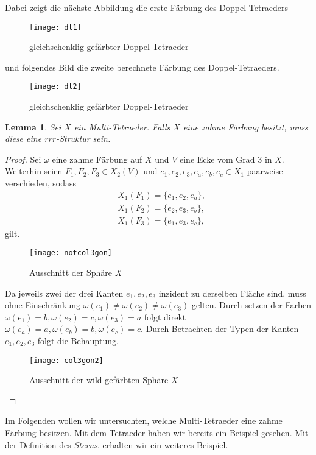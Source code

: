 \documentclass[12pt,titlepage,twoside,cleardoublepage]{article}
\newtheorem{lemma}[zahl]{Lemma}
\numberwithin{equation}{section}
\begin{document}
Dabei zeigt die nächste Abbildung die erste Färbung des Doppel-Tetraeders 
\begin{figure}[H]
\begin{center}
\texttt{[image: dt1]}
\end{center}
\caption{gleichschenklig gefärbter Doppel-Tetraeder}
\end{figure}
und folgendes Bild die zweite berechnete Färbung des Doppel-Tetraeders.
\begin{figure}[H]
\begin{center}
\texttt{[image: dt2]}
\end{center}
\caption{gleichschenklig gefärbter Doppel-Tetraeder}
\end{figure}
\begin{lemma}
Sei $X$ ein Multi-Tetraeder. Falls $X$ eine zahme Färbung besitzt, muss diese eine $rrr$-Struktur sein.
\end{lemma}
\begin{proof}
Sei $\omega$ eine zahme Färbung auf $X$ und $V$ eine Ecke vom Grad 3 in $X.$ Weiterhin seien $F_1,F_2,F_3\in X_2(V)$ und $e_1,e_2,e_3,e_a,e_b,e_c\in X_1$ paarweise verschieden, sodass 
\begin{align*}
&X_1(F_1)=\{e_1,e_2,e_a\},\\
&X_1(F_2)=\{e_2,e_3,e_b\}, \\
&X_1(F_3)=\{e_1,e_3,e_c\},
\end{align*}
gilt.
\begin{figure}[H]
\begin{center}
\texttt{[image: notcol3gon]}
\end{center}
\caption{Ausschnitt der Sphäre $X$}
\end{figure}
Da jeweils zwei der drei Kanten $e_1,e_2,e_3$ inzident zu derselben Fläche sind, muss ohne Einschränkung $\omega(e_1)\neq\omega(e_2)\neq\omega(e_3)$ gelten. Durch setzen der Farben $\omega(e_1)=b,\omega(e_2)=c,\omega(e_3)=a$ folgt direkt $\omega(e_a)=a,\omega(e_b)=b,\omega(e_c)=c.$  Durch Betrachten der Typen der Kanten $e_1,e_2,e_3$ folgt die Behauptung.
\begin{figure}[H]
\begin{center}
\texttt{[image: col3gon2]}
\end{center}
\caption{Ausschnitt der wild-gefärbten Sphäre $X$}
\end{figure}
\end{proof}
Im Folgenden wollen wir untersuchten, welche Multi-Tetraeder eine zahme Färbung besitzen. Mit dem Tetraeder haben wir bereits ein Beispiel gesehen. Mit der Definition des \emph{Sterns}, erhalten wir ein weiteres Beispiel.
\end{document}
